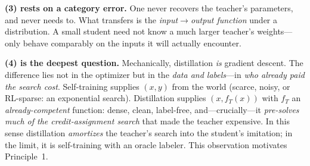\documentclass[11pt]{article}
\begin{document}
\textbf{(3) rests on a category error.} One never recovers the teacher's parameters, and never needs to. What transfers is the \emph{input$\rightarrow$output function} under a distribution. A small student need not know a much larger teacher's weights---only behave comparably on the inputs it will actually encounter.

\textbf{(4) is the deepest question.} Mechanically, distillation \emph{is} gradient descent. The difference lies not in the optimizer but in the \emph{data and labels}---in \emph{who already paid the search cost}. Self-training supplies $(x,y)$ from the world (scarce, noisy, or RL-sparse: an exponential search). Distillation supplies $(x, f_T(x))$ with $f_T$ an \emph{already-competent} function: dense, clean, label-free, and---crucially---it \emph{pre-solves much of the credit-assignment search} that made the teacher expensive. In this sense distillation \emph{amortizes} the teacher's search into the student's imitation; in the limit, it is self-training with an oracle labeler. This observation motivates Principle~1.
\end{document}
